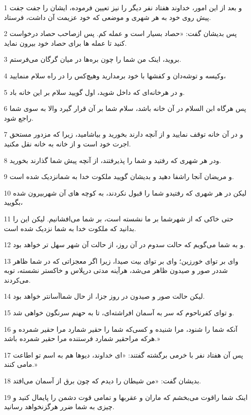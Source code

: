 \par 1 و بعد از این امور، خداوند هفتاد نفر دیگر را نیز تعیین فرموده، ایشان را جفت جفت پیش روی خود به هر شهری و موضعی که خود عزیمت آن داشت، فرستاد.
\par 2 پس بدیشان گفت: «حصاد بسیار است و عمله کم. پس ازصاحب حصاد درخواست کنید تا عمله ها برای حصاد خود بیرون نماید.
\par 3 بروید، اینک من شما را چون بره‌ها در میان گرگان می‌فرستم.
\par 4 وکیسه و توشه‌دان و کفشها با خود برمدارید وهیچ‌کس را در راه سلام منمایید،
\par 5 و در هرخانه‌ای که داخل شوید، اول گویید سلام بر این خانه باد.
\par 6 پس هرگاه ابن السلام در آن خانه باشد، سلام شما بر آن قرار گیرد والا به سوی شما راجع شود.
\par 7 و در آن خانه توقف نمایید و از آنچه دارند بخورید و بیاشامید، زیرا که مزدور مستحق اجرت خود است و از خانه به خانه نقل مکنید.
\par 8 ودر هر شهری که رفتید و شما را پذیرفتند، از آنچه پیش شما گذارند بخورید.
\par 9 و مریضان آنجا راشفا دهید و بدیشان گویید ملکوت خدا به شمانزدیک شده است.
\par 10 لیکن در هر شهری که رفتیدو شما را قبول نکردند، به کوچه های آن شهربیرون شده بگویید،
\par 11 حتی خاکی که از شهرشما بر ما نشسته است، بر شما می‌افشانیم. لیکن این را بدانید که ملکوت خدا به شما نزدیک شده است.
\par 12 و به شما می‌گویم که حالت سدوم در آن روز، از حالت آن شهر سهل تر خواهد بود.
\par 13 وای بر تو‌ای خورزین؛ وای بر تو‌ای بیت صیدا، زیرا اگر معجزاتی که در شما ظاهر شددر صور و صیدون ظاهر می‌شد، هرآینه مدتی درپلاس و خاکستر نشسته، توبه می‌کردند.
\par 14 لیکن حالت صور و صیدون در روز جزا، از حال شماآسانتر خواهد بود.
\par 15 و تو‌ای کفرناحوم که سر به آسمان افراشته‌ای، تا به حهنم سرنگون خواهی شد.
\par 16 آنکه شما را شنود، مرا شنیده و کسی‌که شما را حقیر شمارد مرا حقیر شمرده و هر‌که مراحقیر شمارد فرستنده مرا حقیر شمرده باشد.»
\par 17 پس آن هفتاد نفر با خرمی برگشته گفتند: «ای خداوند، دیوها هم به اسم تو اطاعت مامی کنند.»
\par 18 بدیشان گفت: «من شیطان را دیدم که چون برق از آسمان می‌افتد.
\par 19 اینک شما راقوت می‌بخشم که ماران و عقربها و تمامی قوت دشمن را پایمال کنید و چیزی به شما ضرر هرگزنخواهد رسانید.

